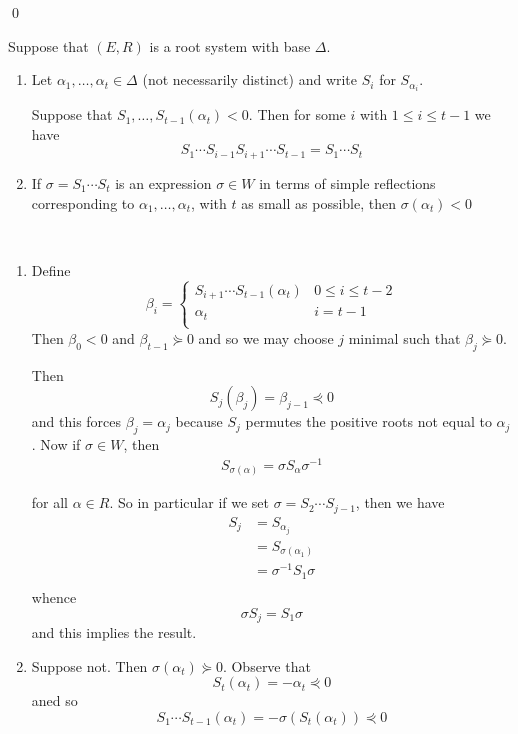 \documentclass[x11names,reqno,14pt]{extarticle}
\begin{document}
\qed

\lem

Suppose that $(E,R)$ is a root system with base $\Delta$. 
\begin{enumerate}[label=(\alph*)]

\item Let $\alpha_1,\dots,\alpha_t \in \Delta$ (not necessarily distinct) and write $S_i$ for $S_{\alpha_i}$. 

Suppose that $S_1, \dots, S_{t-1}(\alpha_t)<0$. Then for some $i$ with $1\leq i\leq t-1$ we have 
\[
S_1\cdots S_{i-1}S_{i + 1}\cdots S_{t-1} = S_1\cdots S_t
\]

\item If $\sigma = S_1\cdots S_t$ is an expression $\sigma\in W$ in terms of simple reflections corresponding to $\alpha_1,\dots,\alpha_t$, with $t$ as small as possible, then $\sigma(\alpha_t)<0$

\end{enumerate}

\proof
\,
\begin{enumerate}[label=(\alph*)]

\item Define
\[
\beta_i = \begin{cases} S_{i + 1}\cdots S_{t-1}(\alpha_t) & 0 \leq i \leq t - 2\\ \alpha_t & i = t - 1 \\ \end{cases}
\]
Then $\beta_0 < 0 $ and $\beta_{t-1}\curlyeqsucc 0$ and so we may choose $j$ minimal such that $\beta_j\curlyeqsucc 0$. 

Then 
\[
S_j(\beta_j) = \beta_{j-1} \curlyeqprec 0
\]
and this forces $\beta_j=\alpha_j$ because $S_j$ permutes the positive roots not equal to $\alpha_j$. Now if $\sigma\in W$, then 
\begin{align*}
S_{\sigma(\alpha)} = \sigma S_\alpha \sigma^{-1}
\end{align*}

for all $\alpha \in R$. So in particular if we set $\sigma = S_2\cdots S_{j-1}$, then we have 
\begin{align*}
S_j & = S_{\alpha_j} \\
	 & = S_{\sigma(\alpha_1)}\\
    & = \sigma^{-1}S_1\sigma \\
\end{align*}
whence
\[
\sigma S_j = S_1\sigma
\]
and this implies the result. 

\item

Suppose not. Then $\sigma(\alpha_t)\curlyeqsucc0$. Observe that 
\[
S_t(\alpha_t) = -\alpha_t\curlyeqprec0
\]
aned so 
\[
S_1\cdots S_{t-1}(\alpha_t) = -\sigma(S_t(\alpha_t))\curlyeqprec0
\]

\end{enumerate}
\end{document}
